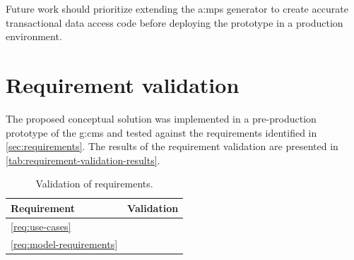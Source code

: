 Future work should prioritize extending the \gls{a:mps} generator to create accurate transactional data access code before deploying the prototype in a production environment.

\pagebreak

\section{Requirement validation}
\label{sec:ProjectReview}

The proposed conceptual solution was implemented in a pre-production prototype of the \gls{g:cms} and tested against the requirements identified in \cref{sec:requirements}. The results of the requirement validation are presented in \vref{tab:requirement-validation-results}.

\renewcommand{\arraystretch}{1.25}
\begin{table}[H]
    \centering
    \caption{Validation of requirements.}
    \label{tab:requirement-validation-results}
    \begin{tabular}{l|p{}}
        \toprule
        Requirement & Validation \\
        \midrule
        \ref{req:use-cases} &  \lorizzleshortnospace \\ \hline
        \ref{req:model-requirements} &  \lorizzleshortnospace \\
        \bottomrule
    \end{tabular}
\end{table}
\renewcommand{\arraystretch}{1}